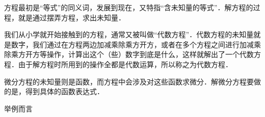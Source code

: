 
方程最初是“等式”的同义词，发展到现在，又特指“含未知量的等式”．解方程的过程，就是通过摆弄方程，求出未知量．

我们从小学就开始接触到的方程，通常又被叫做“代数方程”．代数方程的未知量就是数字，我们通过在方程两边加减乘除乘方开方，或者在多个方程之间进行加减乘除乘方开方等操作，计算出这个（些）数字到底是什么，这样就解出了一个代数方程．由于解方程时所用到的操作全都是代数运算，所以称之为代数方程．

微分方程的未知量则是函数，而方程中会涉及对这些函数求微分．解微分方程要做的是，得到具体的函数表达式．

举例而言





















